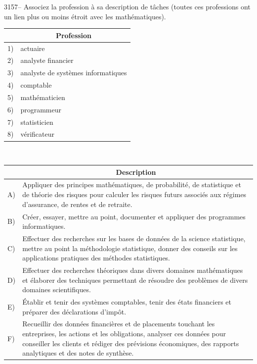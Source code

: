 \documentclass[letterpaper, 12pt]{article}
\begin{document}
3157-- Associez la profession \`a sa description de t\^aches (toutes ces professions ont un lien plus ou moins \'etroit avec les math\'ematiques).\\
\begin{center}
\begin{tabular}{|c|l|} \cline{2-2}
\multicolumn{1}{c|}{} & \multicolumn{1}{|c|}{\bf Profession}\\ \hline
1) & actuaire\\ \hline
2) & analyste financier\\ \hline
3) & analyste de syst\`emes informatiques\\ \hline
4) & comptable\\ \hline
5) & math\'ematicien\\ \hline
6) & programmeur\\ \hline
7) & statisticien\\ \hline
8) & v\'erificateur\\ \hline
\end{tabular} \ \ \ \ \ \ \ \
\begin{tabular}{|l|p{8cm}|} \cline{2-2}
\multicolumn{1}{c|}{} & \multicolumn{1}{|c|}{\bf Description}\\ \hline
A) & Appliquer des principes math\'ematiques, de probabilit\'e, de statistique et de th\'eorie des risques pour calculer les risques futurs associ\'es aux r\'egimes d'assurance, de rentes et de retraite.\\ \hline
B) & Cr\'eer, essayer, mettre au point, documenter et appliquer des programmes informatiques.\\ \hline
C) & Effectuer des recherches sur les bases de donn\'ees de la science statistique, mettre au point la m\'ethodologie statistique, donner des conseils sur les applications pratiques des m\'ethodes statistiques.\\ \hline
D) & Effectuer des recherches th\'eoriques dans divers domaines math\'ematiques et \'elaborer des techniques permettant de r\'esoudre des probl\`emes de divers domaines scientifiques.\\ \hline
E) & \'Etablir et tenir des syst\`emes comptables, tenir des \'etats financiers et pr\'eparer des d\'eclarations d'imp\^ot.\\ \hline
F) & Recueillir des donn\'ees financi\`eres et de placements touchant les entreprises, les actions et les obligations, analyser ces donn\'ees pour conseiller les clients et r\'ediger des pr\'evisions \'economiques, des rapports analytiques et des notes de synth\`ese.\\ \hline
\end{tabular}
\end{center}
\end{document}
